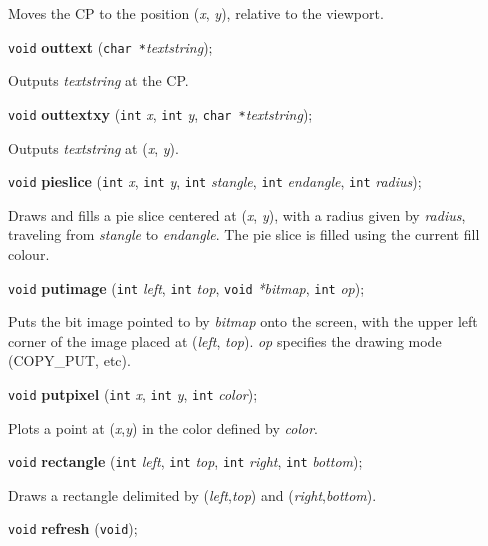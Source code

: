 \documentclass[a4paper,11pt]{article}
\newcommand{\V}{\texttt{void}}      %
\newcommand{\I}{\texttt{int}}       %
\newcommand{\C}{\texttt{char *}}    %
\newcommand{\func}[1]{\textbf{#1}}  %
\newcommand{\A}[1]{\emph{#1}}       %
\newenvironment{bgi}
{ %
  \begin{snugshade}
}
{ %
  \end{snugshade}
}
\begin{document}
Moves the CP to the position (\A{x}, \A{y}), relative to the
viewport.


\begin{bgi}
\V{} \func{outtext} (\C{}\A{textstring});
\end{bgi}

Outputs \A{textstring} at the CP.


\begin{bgi}
\V{} \func{outtextxy} (\I{} \A{x}, \I{} \A{y}, \C{}\A{textstring});
\end{bgi}

Outputs \A{textstring} at (\A{x}, \A{y}).


\begin{bgi}
\V{} \func{pieslice} (\I{} \A{x}, \I{} \A{y}, \I{} \A{stangle}, \I{}
\A{endangle}, \I{} \A{radius});
\end{bgi}

Draws and fills a pie slice centered at (\A{x}, \A{y}), with a radius
given by \A{radius}, traveling from \A{stangle} to \A{endangle}. The
pie slice is filled using the current fill colour.


\begin{bgi}
\V{} \func{putimage} (\I{} \A{left}, \I{} \A{top}, \V{} \A{*bitmap},
\I{} \A{op});
\end{bgi}

Puts the bit image pointed to by \A{bitmap} onto the screen, with the
upper left corner of the image placed at (\A{left}, \A{top}). \A{op}
specifies the drawing mode (COPY\_PUT, etc).


\begin{bgi}
\V{} \func{putpixel} (\I{} \A{x}, \I{} \A{y}, \I{} \A{color}); 
\end{bgi}

Plots a point at (\A{x},\A{y}) in the color defined by \A{color}.


\begin{bgi}
\V{} \func{rectangle} (\I{} \A{left}, \I{} \A{top}, \I{} \A{right},
\I{} \A{bottom});
\end{bgi}

Draws a rectangle delimited by (\A{left},\A{top}) and
(\A{right},\A{bottom}).


\begin{bgi}
\V{} \func{refresh} (\V{});
\end{bgi}
\end{document}
